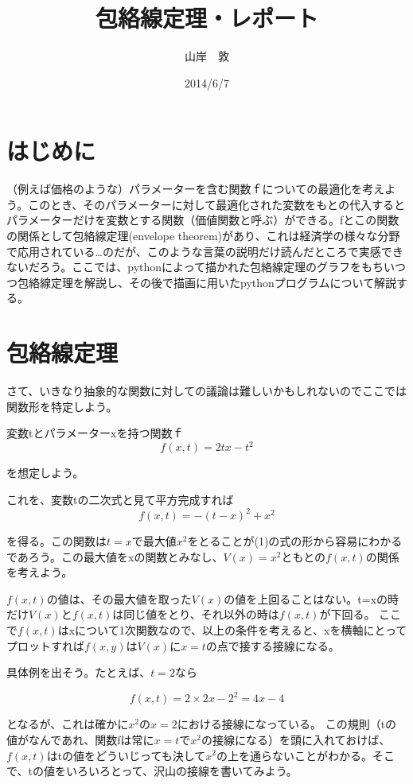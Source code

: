 \documentclass[11pt,a4j,fleqn]{jarticle}
\title{包絡線定理・レポート}
\author{山岸　敦}
\date{2014/6/7}
\begin{document}
\maketitle

\section{はじめに}

（例えば価格のような）パラメーターを含む関数ｆについての最適化を考えよう。このとき、そのパラメーターに対して最適化された変数をもとの代入するとパラメーターだけを変数とする関数（価値関数と呼ぶ）ができる。fとこの関数の関係として包絡線定理(envelope theorem)があり、これは経済学の様々な分野で応用されている…のだが、このような言葉の説明だけ読んだところで実感できないだろう。ここでは、pythonによって描かれた包絡線定理のグラフをもちいつつ包絡線定理を解説し、その後で描画に用いたpythonプログラムについて解説する。


\section{包絡線定理}

さて、いきなり抽象的な関数に対しての議論は難しいかもしれないのでここでは関数形を特定しよう。

変数tとパラメーターxを持つ関数ｆ
\[
f(x, t) =2 t x - t^2
\]

を想定しよう。

これを、変数tの二次式と見て平方完成すれば
\begin{equation}
f(x, t)  = -(t - x)^2 + x^2 \label{eq:square-1}
\end{equation}

を得る。この関数は$t=x$で最大値$x^2$をとることが(1)の式の形から容易にわかるであろう。この最大値をxの関数とみなし、$V(x)=x^2$ともとの$f(x,t)$の関係を考えよう。

$f(x,t)$の値は、その最大値を取った$V(x)$の値を上回ることはない。t=xの時だけ$V(x)$と$f(x,t)$は同じ値をとり、それ以外の時は$f(x,t)$が下回る。
ここで$f(x,t)$はxについて1次関数なので、以上の条件を考えると、xを横軸にとってプロットすれば$f(x,y)$は$V(x)$に$x=t$の点で接する接線になる。

具体例を出そう。たとえば、$t=2$なら

\begin{equation}
f(x, t) = 2×2x-2^2 = 4x-4
\end{equation}

となるが、これは確かに$x^2$の$x=2$における接線になっている。
この規則（tの値がなんであれ、関数fは常に$x=t$で$x^2$の接線になる）を頭に入れておけば、$f(x,t)$はtの値をどういじっても決して$x^2$の上を通らないことがわかる。そこで、tの値をいろいろとって、沢山の接線を書いてみよう。
\end{document}
